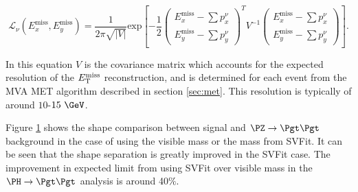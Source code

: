 \begin{equation}
\mathcal{L}_{\nu}(E_{x}^{\text{miss}},E_{y}^{\text{miss}}) =
\frac{1}{2\pi\sqrt{|V|}}\text{exp}\left[
-\frac{1}{2}\begin{pmatrix}E_{x}^{\text{miss}}-\sum p_{x}^{\nu} \\
E_{y}^{\text{miss}}-\sum p_{y}^{\nu}\end{pmatrix}^{T} V^{-1}
\begin{pmatrix}E_{x}^{\text{miss}}-\sum p_{x}^{\nu} \\ E_{y}^{\text{miss}}-\sum
p_{y}^{\nu}\end{pmatrix}\right].
\end{equation}

In this equation $V$ is the covariance matrix which accounts for the expected
resolution of the $E_{\mathrm{T}}^{\text{miss}}$ reconstruction, and is determined for each event from
the MVA MET algorithm described in section \ref{sec:met}. This resolution is
typically of around $10$-$15~\GeV$. 

Figure \ref{fig:svfit} shows the shape comparison between signal and $\PZ \to \Pgt\Pgt$
background in the case of using the visible mass or the mass from SVFit. It can
be seen that the shape separation is greatly improved in the SVFit case.
The improvement in expected limit from using SVFit over visible mass in the $\PH
\to \Pgt\Pgt$ analysis is around 40$\%$.

\begin{figure}
\begin{center}
\end{center}
\caption{
}
\label{fig:svfit}
\end{figure}

